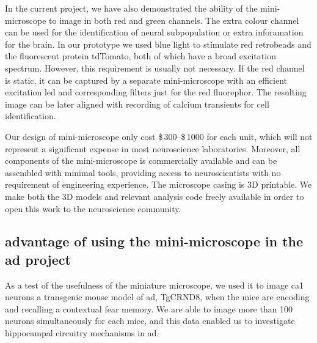 In the current project, we have also demonstrated the ability of the mini-microscope to image in both red and green channels. The extra colour channel can be used for the identification of neural subpopulation or extra inforamation for the brain. In our prototype we used blue light to stimulate red retrobeads and the fluorescent protein tdTomato, both of which have a broad excitation spectrum. However, this requirement is usually not necessary. If the red channel is static, it can be captured by a separate mini-microscope with an efficient excitation \gls{led} and corresponding filters just for the red fluorephor. The resulting image can be later aligned with recording of calcium transients for cell identification. 

Our design of mini-microscope only cost \$\,300--\$\,1000 for each unit, which will not represent a significant expense in most neuroscience laboratories. Moreover, all components of the mini-microscope is commercially available and can be assembled with minimal tools, providing access to neuroscientists with no requirement of engineering experience. The microscope casing is 3D printable. We make both the 3D models and relevant analysis code freely available in order to open this work to the neuroscience community.

\subsection{advantage of using the mini-microscope in the \gls{ad} project}

As a test of the usefulness of the miniature microscope, we used it to image \gls{ca1} neurons a transgenic mouse model of \gls{ad}, TgCRND8, when the mice are encoding and recalling a contextual fear memory. We are able to image more than \num{100} neurons simultaneously for each mice, and this data enabled us to investigate hippocampal circuitry mechanisms in \gls{ad}.


